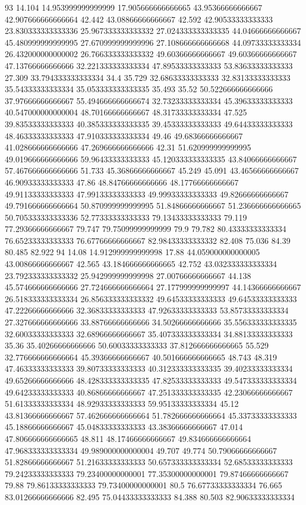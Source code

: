 93 14.104 14.953999999999999 17.905666666666665 43.95366666666667 42.907666666666664 42.442 43.08866666666667 42.592 42.90533333333333 23.830333333333336 25.967333333333332 27.024333333333335 44.04666666666667 45.480999999999995 27.670999999999996 27.108666666666668 44.09733333333334 26.432000000000002 26.766333333333332 49.60366666666667 49.60366666666667 47.13766666666666 32.221333333333334 47.89533333333333 53.83633333333333 27.309 33.794333333333334 34.4 35.729 32.68633333333333 32.83133333333333 35.54333333333334 35.053333333333335 35.493 35.52 50.522666666666666 37.97666666666667 55.494666666666674 32.73233333333334 45.39633333333333 40.547000000000004 48.70166666666667 48.31733333333334 47.525 39.83533333333333 40.385333333333335 39.45333333333333 49.64433333333333 48.46333333333333 47.910333333333334 49.46 49.68366666666667 41.028666666666666 47.269666666666666 42.31 51.620999999999995 49.019666666666666 59.96433333333333 45.120333333333335 43.84066666666667 57.467666666666666 51.733 45.36866666666667 45.249 45.091 43.46566666666667 46.90933333333333 47.86 48.84766666666666 48.17766666666667 49.91133333333333 47.99133333333333 49.99933333333333 49.82666666666667 49.791666666666664 50.870999999999995 51.84866666666667 51.236666666666665 50.705333333333336 52.77333333333333 79.13433333333333 79.119 77.29366666666667 79.747 79.75099999999999 79.9 79.782 80.43333333333334 76.65233333333333 76.67766666666667 82.98433333333332 82.408 75.036 84.39 80.485 82.922
94 14.08 14.912999999999998 17.88 44.059000000000005 43.00866666666667 42.565 43.184666666666665 42.752 43.032333333333334 23.792333333333332 25.942999999999998 27.00766666666667 44.138 45.574666666666666 27.724666666666664 27.177999999999997 44.14366666666667 26.518333333333334 26.856333333333332 49.64533333333333 49.64533333333333 47.22266666666666 32.36833333333333 47.92633333333333 53.85733333333334 27.327666666666666 33.88766666666666 34.50266666666666 35.556333333333335 32.60033333333333 32.68966666666667 35.407333333333334 34.88133333333333 35.36 35.40266666666666 50.60033333333333 37.812666666666665 55.529 32.776666666666664 45.39366666666667 40.501666666666665 48.743 48.319 47.46333333333333 39.80733333333333 40.312333333333335 39.40233333333334 49.65266666666666 48.428333333333335 47.82533333333333 49.547333333333334 49.64233333333333 40.86866666666667 47.251333333333335 42.23066666666667 51.61333333333334 48.92933333333333 59.95133333333334 45.12 43.81366666666667 57.462666666666664 51.782666666666664 45.33733333333333 45.18866666666667 45.04833333333333 43.38366666666667 47.014 47.806666666666665 48.811 48.17466666666667 49.834666666666664 47.968333333333334 49.989000000000004 49.707 49.774 50.79066666666667 51.82866666666667 51.21633333333333 50.657333333333334 52.68533333333333 79.24233333333333 79.23400000000001 77.35300000000001 79.87466666666667 79.88 79.86133333333333 79.73400000000001 80.5 76.67733333333334 76.665 83.01266666666666 82.495 75.04433333333333 84.388 80.503 82.90633333333334
